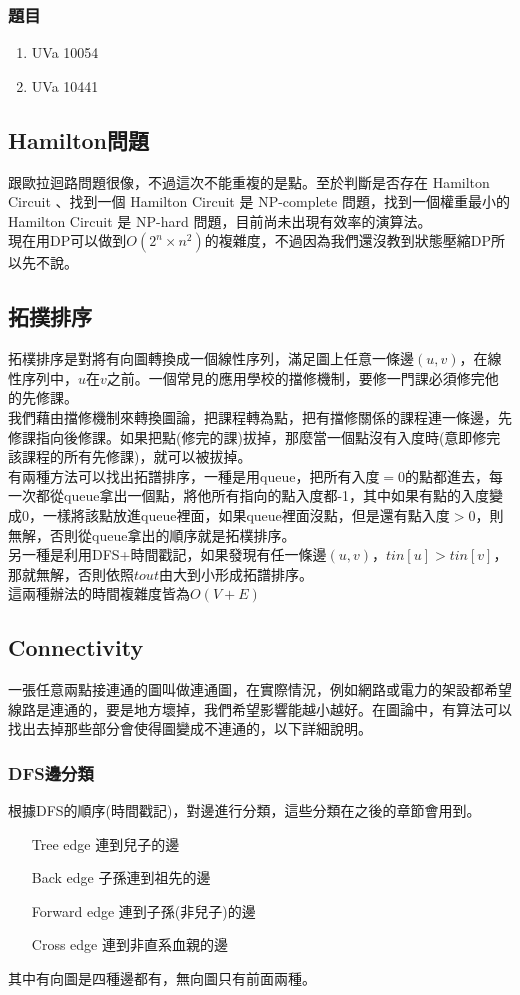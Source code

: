 \subsubsection{題目}
\begin{enumerate}
\item UVa 10054
\item UVa 10441
\end{enumerate}
\subsection{Hamilton問題}
跟歐拉迴路問題很像，不過這次不能重複的是點。至於判斷是否存在 Hamilton Circuit 、找到一個 Hamilton Circuit 是 NP-complete 問題，找到一個權重最小的 Hamilton Circuit 是 NP-hard 問題，目前尚未出現有效率的演算法。\\
現在用DP可以做到$O(2^n\times n^2)$的複雜度，不過因為我們還沒教到狀態壓縮DP所以先不說。
\subsection{拓撲排序}
拓樸排序是對將有向圖轉換成一個線性序列，滿足圖上任意一條邊$(u,v)$，在線性序列中，$u$在$v$之前。一個常見的應用學校的擋修機制，要修一門課必須修完他的先修課。\\
我們藉由擋修機制來轉換圖論，把課程轉為點，把有擋修關係的課程連一條邊，先修課指向後修課。如果把點(修完的課)拔掉，那麼當一個點沒有入度時(意即修完該課程的所有先修課)，就可以被拔掉。\\
有兩種方法可以找出拓譜排序，一種是用queue，把所有入度$=0$的點都進去，每一次都從queue拿出一個點，將他所有指向的點入度都-1，其中如果有點的入度變成0，一樣將該點放進queue裡面，如果queue裡面沒點，但是還有點入度$>0$，則無解，否則從queue拿出的順序就是拓樸排序。\\

另一種是利用DFS+時間戳記，如果發現有任一條邊$(u,v)$，$tin[u]>tin[v]$，那就無解，否則依照$tout$由大到小形成拓譜排序。\\
這兩種辦法的時間複雜度皆為$O(V+E)$
\subsection{Connectivity}
一張任意兩點接連通的圖叫做連通圖，在實際情況，例如網路或電力的架設都希望線路是連通的，要是地方壞掉，我們希望影響能越小越好。在圖論中，有算法可以找出去掉那些部分會使得圖變成不連通的，以下詳細說明。
\subsubsection{DFS邊分類}
根據DFS的順序(時間戳記)，對邊進行分類，這些分類在之後的章節會用到。
\begin{enumerate}
\item [Tree edge] 連到兒子的邊
\item [Back edge] 子孫連到祖先的邊
\item [Forward edge] 連到子孫(非兒子)的邊
\item [Cross edge] 連到非直系血親的邊
\end{enumerate}
其中有向圖是四種邊都有，無向圖只有前面兩種。
